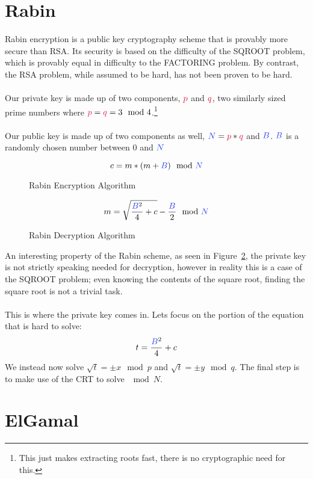 \section{Rabin}
	Rabin encryption is a public key cryptography scheme that is provably more secure than RSA. Its security is based on the difficulty of the SQROOT problem, which is provably equal in difficulty to the FACTORING problem. By contrast, the RSA problem, while assumed to be hard, has not been proven to be hard.\\
	\\
	Our private key is made up of two components, $\textcolor{R}{p}$ and $\textcolor{R}{q}$, two similarly sized prime numbers where $\textcolor{R}{p} = \textcolor{R}{q} = 3 \mod 4$.\footnote{This just makes extracting roots fast, there is no cryptographic need for this.}\\
	\\
	Our public key is made up of two components as well, $\textcolor{B}{N} = \textcolor{R}{p}*\textcolor{R}{q}$ and $\textcolor{B}{B}$. $\textcolor{B}{B}$ is a randomly chosen number between $0$ and $\textcolor{B}{N}$\\
  \begin{figure}[htp!]
		$$c = m * (m + \textcolor{B}{B}) \mod \textcolor{B}{N}$$
  \caption{Rabin Encryption Algorithm}
  \label{fig:rabin-enc}
  \end{figure}

  \begin{figure}[htp!]
		$$m = \sqrt{\frac{\textcolor{B}{B}^2}{4}+c} - \frac{\textcolor{B}{B}}{2} \mod \textcolor{B}{N}$$
  \caption{Rabin Decryption Algorithm}
  \label{fig:rabin-dec}
  \end{figure}
	An interesting property of the Rabin scheme, as seen in Figure~\ref{fig:rabin-dec}, the private key is not strictly speaking needed for decryption, however in reality this is a case of the SQROOT problem; even knowing the contents of the square root, finding the square root is not a trivial task.\\
	\\
	This is where the private key comes in. Lets focus on the portion of the equation that is hard to solve:
	$$t = \frac{\textcolor{B}{B}^2}{4}+c$$
	We instead now solve $\sqrt{t} = \pm x\mod p $ and $\sqrt{t} = \pm y \mod q$. The final step is to make use of the CRT to solve $\mod N$. %


\section{ElGamal}